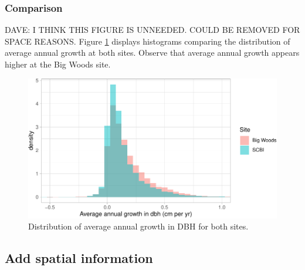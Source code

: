 \documentclass[12pt]{article}
\newenvironment{Shaded}{\begin{snugshade}}{\end{snugshade}}
\newcommand{\CommentTok}[1]{\textcolor[rgb]{0.56,0.35,0.01}{\textit{#1}}}
\newcommand{\DataTypeTok}[1]{\textcolor[rgb]{0.13,0.29,0.53}{#1}}
\newcommand{\DecValTok}[1]{\textcolor[rgb]{0.00,0.00,0.81}{#1}}
\newcommand{\KeywordTok}[1]{\textcolor[rgb]{0.13,0.29,0.53}{\textbf{#1}}}
\newcommand{\NormalTok}[1]{#1}
\newcommand{\OperatorTok}[1]{\textcolor[rgb]{0.81,0.36,0.00}{\textbf{#1}}}
\newcommand{\StringTok}[1]{\textcolor[rgb]{0.31,0.60,0.02}{#1}}
\begin{document}
\begin{Shaded}
\end{Shaded}

\hypertarget{comparison}{%
\subsubsection{Comparison}\label{comparison}}

DAVE: I THINK THIS FIGURE IS UNNEEDED. COULD BE REMOVED FOR SPACE
REASONS. Figure \ref{fig:growth-histogram} displays histograms comparing
the distribution of average annual growth at both sites. Observe that
average annual growth appears higher at the Big Woods site.

\begin{figure}

{\centering \includegraphics[width=1\linewidth]{Figures/growth-histogram-1} 

}

\caption{Distribution of average annual growth in DBH for both sites.}\label{fig:growth-histogram}
\end{figure}

\hypertarget{spatial-information}{%
\subsection{Add spatial information}\label{spatial-information}}
\end{document}
